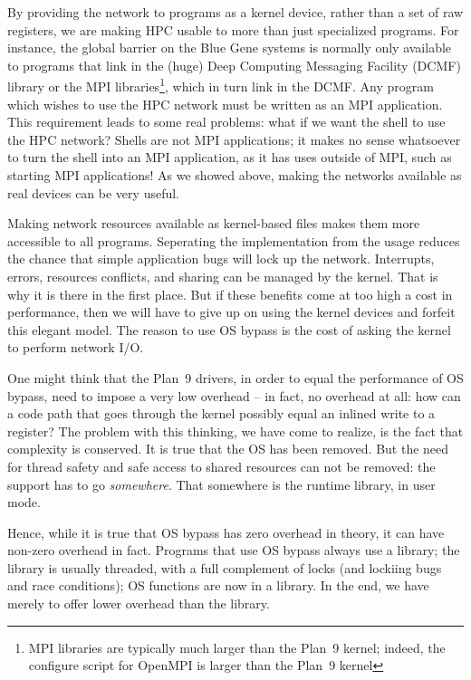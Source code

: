 \documentclass[letterpaper,twocolumn,10pt]{article}
\begin{document}
By providing the network to programs as a kernel device, rather than a set of raw registers, we are making HPC usable 
to more than just specialized programs. For instance, the global barrier on the Blue Gene systems is normally only 
available to programs that link in the (huge) Deep Computing Messaging Facility (DCMF) library or the 
MPI libraries\footnote{MPI libraries are typically much larger than the Plan~9 kernel; indeed, the configure script for OpenMPI is larger than the Plan~9 kernel}, which in turn 
link in the DCMF. Any program which wishes to use the HPC network must be written as an MPI 
application. This requirement leads to some real problems: what if we want the shell to use the HPC network? 
Shells are not MPI applications; it makes
no sense whatsoever to turn the shell into an MPI application, as it has uses outside of MPI, such 
as starting MPI applications! As we showed above, making the networks available as real devices can be very useful. 

Making network resources available as kernel-based files
makes them more accessible to all programs. Seperating the 
implementation from the usage reduces the chance that simple application bugs will lock up the network. 
Interrupts, errors, resources conflicts, and sharing can be managed by the kernel. That is why it 
is there in the first place. But if these benefits come at too high a cost in performance, then we will have to give up 
on using the kernel devices and forfeit this elegant model. The reason to use OS bypass is the cost of asking the kernel to 
perform network I/O. 

One might think that the Plan~9 drivers, in order to equal the performance of OS bypass, need to impose a very 
low overhead -- in fact, no overhead at all: how can a code path that goes through the kernel possibly equal an
inlined write to a register? The problem with this thinking, we have come to realize, is the fact that complexity is conserved. It is true that the OS has been removed. But the need for thread safety and safe access to shared resources can not be removed: the support  has to go {\em somewhere}. That somewhere is the runtime library, in user mode. 

Hence, while it is true that OS bypass has zero overhead in theory, it can have non-zero overhead in fact. 
Programs that use OS bypass always use a library; the library is usually threaded, with a full complement of locks (and 
lockiing bugs and race conditions); OS functions are now in a library. In the end, we have merely to offer lower overhead than the library. 
\end{document}
